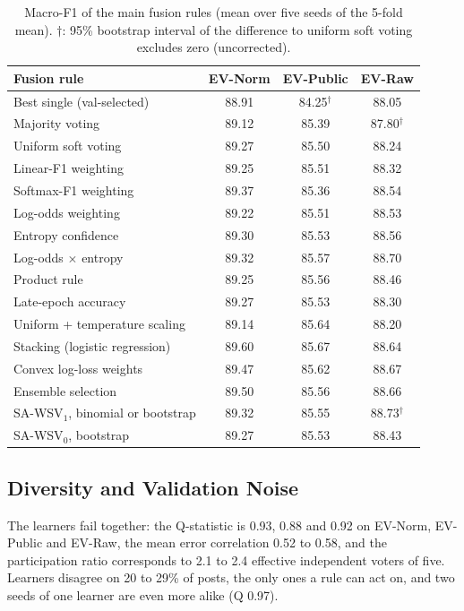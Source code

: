 \documentclass[conference,a4paper]{IEEEtran}
\newcommand{\rcz}{SA\mbox{-}WSV$_0$}
\newcommand{\rco}{SA\mbox{-}WSV$_1$}
\begin{document}
\begin{table}[t]
\caption{Macro-F1 of the main fusion rules (mean over five seeds of the 5-fold mean). $\dagger$: 95\% bootstrap interval of the difference to uniform soft voting excludes zero (uncorrected).}
\label{tab:fusion}
\centering
\footnotesize
\setlength{\tabcolsep}{3pt}
\begin{tabular}{lccc}
\toprule
Fusion rule & EV-Norm & EV-Public & EV-Raw \\
\midrule
Best single (val-selected)        & 88.91 & 84.25$^{\dagger}$ & 88.05 \\
Majority voting                   & 89.12 & 85.39 & 87.80$^{\dagger}$ \\
Uniform soft voting               & 89.27 & 85.50 & 88.24 \\
Linear-F1 weighting \cite{elgabry2026} & 89.25 & 85.51 & 88.32 \\
Softmax-F1 weighting              & 89.37 & 85.36 & 88.54 \\
Log-odds weighting                & 89.22 & 85.51 & 88.53 \\
Entropy confidence                & 89.30 & 85.53 & 88.56 \\
Log-odds $\times$ entropy         & 89.32 & 85.57 & 88.70 \\
Product rule                      & 89.25 & 85.56 & 88.46 \\
Late-epoch accuracy \cite{wu2026} & 89.27 & 85.53 & 88.30 \\
Uniform + temperature scaling     & 89.14 & 85.64 & 88.20 \\
Stacking (logistic regression)    & 89.60 & 85.67 & 88.64 \\
Convex log-loss weights           & 89.47 & 85.62 & 88.67 \\
Ensemble selection \cite{purucker2023} & 89.50 & 85.56 & 88.66 \\
\rco, binomial or bootstrap       & 89.32 & 85.55 & 88.73$^{\dagger}$ \\
\rcz, bootstrap                   & 89.27 & 85.53 & 88.43 \\
\bottomrule
\end{tabular}
\end{table}

\subsection{Diversity and Validation Noise}
\label{sec:noise}
The learners fail together: the Q-statistic is 0.93, 0.88 and 0.92 on EV-Norm, EV-Public and EV-Raw, the mean error correlation 0.52 to 0.58, and the participation ratio corresponds to 2.1 to 2.4 effective independent voters of five. Learners disagree on 20 to 29\% of posts, the only ones a rule can act on, and two seeds of one learner are even more alike (Q 0.97).
\end{document}
